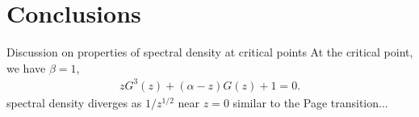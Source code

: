 \documentclass[aps,pra,groupedaddress,twocolumn,notitlepage,superscriptaddress,10pt]{revtex4-1}
\begin{document}
\section{Conclusions}

Discussion on properties of spectral density at critical points
At the critical point, we have $\beta=1$,
\begin{align}
z G^3(z) + (\alpha -z ) G(z) +1 =0.
\end{align}
spectral density diverges as $1/z^{1/2}$ near $z=0$ similar to the Page transition...


\acknowledgements


\end{document}
